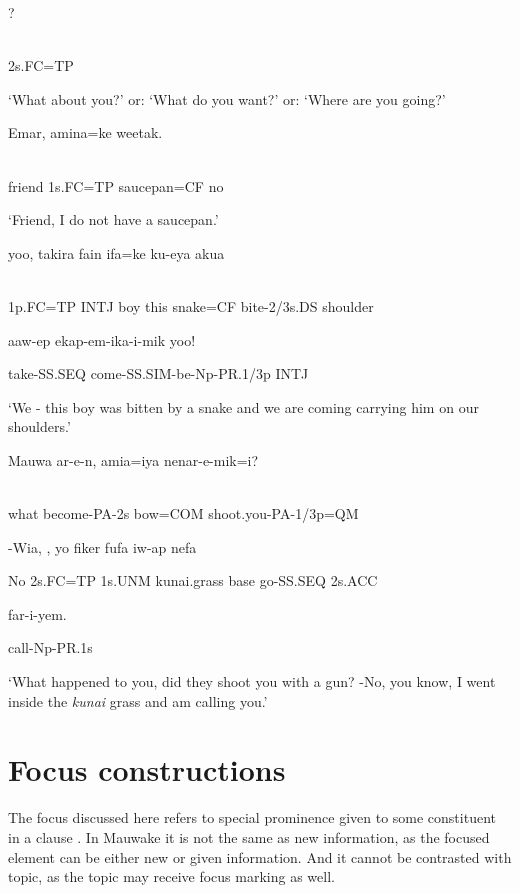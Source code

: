 \ea%
\label{ex:x1684}
\gll {}? \\
      \\
\glt
\z

2s.FC=TP

`What about you?' or: `What do you want?' or: `Where are you going?'

\ea%
\label{ex:x1685}
\gll Emar,    amina=ke  weetak. \\
      \\
\glt
\z

friend  1s.FC=TP  saucepan=CF  no

`Friend, I do not have a saucepan.'

\ea%
\label{ex:x1686}
\gll {}  yoo,  takira  fain  ifa=ke  ku-eya  akua  \\
      \\
\glt
\z

1p.FC=TP  INTJ  boy  this  snake=CF  bite-2/3s.DS  shoulder

aaw-ep  ekap-em-ika-i-mik  yoo!

take-SS.SEQ  come-SS.SIM-be-Np-PR.1/3p  INTJ

`We - this boy was bitten by a snake and we are coming carrying him on our shoulders.'

\ea%
\label{ex:x1687}
\gll Mauwa  ar-e-n,  amia=iya  nenar-e-mik=i?  \\
      \\
\glt
\z

what  become-PA-2s  bow=COM  shoot.you-PA-1/3p=QM

-Wia,  ,  yo  fiker  fufa  iw-ap  nefa

No  2s.FC=TP  1s.UNM  kunai.grass  base  go-SS.SEQ  2s.ACC

far-i-yem.

call-Np-PR.1s

`What happened to you, did they shoot you with a gun? -No, you know, I went inside the \textit{kunai} grass and am calling you.'

\section{Focus constructions}\footnotemark{}
\hypertarget{RefHeading23901935131865}{}
The focus discussed here refers to special prominence given to some constituent in a clause \citep[174]{Dixon2010a}. In Mauwake it is not the same as new information, as the focused element can be either new or given information. And it cannot be contrasted with topic, as the topic may receive focus marking as well. 

